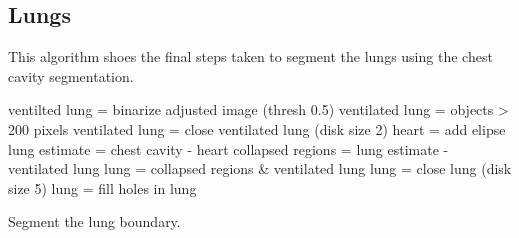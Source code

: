 \begin{appendices}
\section{Lungs}

This algorithm shoes the final steps taken to segment the lungs using the chest cavity 
segmentation. \\

\begin{algorithm}[H]
	\SetAlgoLined
		ventilted lung = binarize adjusted image (thresh 0.5) \;
		ventilated lung = objects > 200 pixels \;
		ventilated lung = close ventilated lung (disk size 2) \;
		heart = add elipse \;
		lung estimate = chest cavity - heart \;
		collapsed regions = lung estimate - ventilated lung \;
		lung = collapsed regions \& ventilated lung \;
		lung = close lung (disk size 5) \;
		lung = fill holes in lung \;
	\caption{Segment the lung boundary.}
\end{algorithm}

\end{appendices}